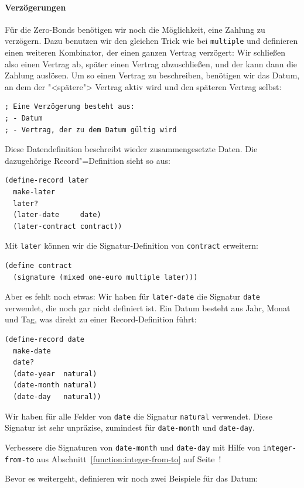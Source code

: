\paragraph{Verzögerungen}
Für die Zero-Bonds benötigen wir noch die Möglichkeit,
eine Zahlung zu verzögern.
Dazu benutzen wir den gleichen Trick wie
bei \lstinline{multiple} und definieren einen weiteren Kombinator, der
einen ganzen Vertrag verzögert: Wir schließen also einen Vertrag ab,
später einen Vertrag abzuschließen, und der kann dann die Zahlung
auslösen.  Um so einen Vertrag zu beschreiben, benötigen wir das
Datum, an dem der "<spätere"> Vertrag aktiv wird und den späteren
Vertrag selbst:
%
\begin{lstlisting}
; Eine Verzögerung besteht aus:
; - Datum
; - Vertrag, der zu dem Datum gültig wird
\end{lstlisting}
%
Diese Datendefinition beschreibt wieder zusammengesetzte Daten.  Die
dazugehörige Record"=Definition sieht so aus:
%
\begin{lstlisting}
(define-record later
  make-later
  later?
  (later-date     date)
  (later-contract contract))
\end{lstlisting}
%
Mit \lstinline{later} können wir die Signatur-Definition von
\lstinline{contract} erweitern:
%
\begin{lstlisting}
(define contract
  (signature (mixed one-euro multiple later)))
\end{lstlisting}
%
Aber es fehlt noch etwas: Wir haben für \lstinline{later-date} die
Signatur \lstinline{date} verwendet, die noch gar nicht definiert ist.
Ein Datum besteht aus Jahr, Monat und Tag, was direkt zu einer
Record-Definition führt:
%
\begin{lstlisting}
(define-record date
  make-date
  date?
  (date-year  natural)
  (date-month natural)
  (date-day   natural))
\end{lstlisting}
%
\begin{aufgabeinline}
  Wir haben für alle Felder von \lstinline{date} die Signatur
  \lstinline{natural} verwendet. Diese Signatur ist sehr unpräzise,
  zumindest für \lstinline{date-month} und \lstinline{date-day}.

  Verbessere die Signaturen von \lstinline{date-month} und
  \lstinline{date-day} mit Hilfe von \lstinline{integer-from-to}
  aus Abschnitt~\ref{function:integer-from-to} auf
  Seite~\pageref{function:integer-from-to}!
\end{aufgabeinline}
%
Bevor es weitergeht, definieren wir noch zwei Beispiele für das Datum:
